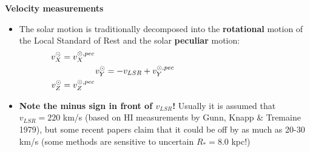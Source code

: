\documentclass[letterpaper,landscape]{slides}
\begin{document}

\begin{slide}

\begin{center}
\bfseries
\large {} Velocity measurements 
\end{center}
\vskip 0.2in
\begin{itemize}
\item The solar motion is traditionally decomposed into the 
{\bf rotational} motion of the Local Standard of Rest and
the solar {\bf peculiar} motion:
\begin{eqnarray} 
   v_X^\odot = v_X^{\odot,pec}             \hskip 3in   \nonumber \\
   v_Y^\odot = -v_{LSR} + v_Y^{\odot,pec }  \hskip 1.7in \nonumber \\
   v_Z^\odot = v_Z^{\odot,pec}             \hskip 3in   \nonumber       
\end{eqnarray} 
\item {\bf Note the minus sign in front of $v_{LSR}$!} Usually it is assumed
that {\color{blue} $v_{LSR}=220$ km/s} (based on HI measurements by Gunn, Knapp \& Tremaine 
1979), but some recent papers claim that it could be off by as much as 
20-30 km/s (some methods are sensitive to uncertain $R_\ast=8.0$ kpc!)
\end{itemize}    
\vfill

\end{slide}


\end{document}
